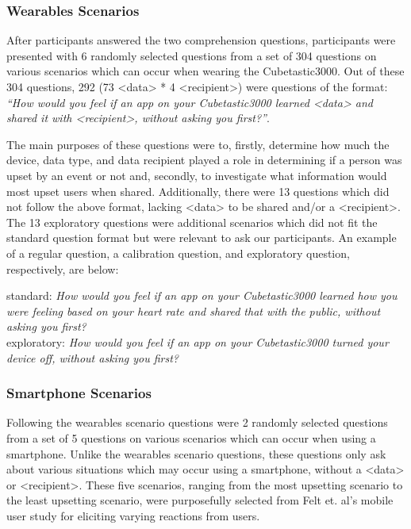 \documentclass{acm_proc_article-sp}
\begin{document}
\subsubsection{Wearables Scenarios}

After participants answered the two comprehension questions, participants were presented with 6 randomly selected questions from a set of 304 questions on various scenarios which can occur when wearing the Cubetastic3000. Out of these 304 questions, 292 (73 <data> * 4 <recipient>) were questions of the format: \textit{``How would you feel if an app on your Cubetastic3000 learned <data> and shared it with <recipient>, without asking you first?''}. 

The main purposes of these questions were to, firstly, determine how much the device, data type, and data recipient played a role in determining if a person was upset by an event or not and, secondly, to investigate what information would most upset users when shared. Additionally, there were 13 questions which did not follow the above format, lacking <data> to be shared and/or a <recipient>.  The 13 exploratory questions were additional scenarios which did not fit the standard question format but were relevant to ask our participants. An example of a regular question, a calibration question, and exploratory question, respectively, are below:  

standard: \textit{How would you feel if an app on your Cubetastic3000 learned how you were feeling based on your heart rate and shared that with the public, without asking you first?}\\[-.5cm]

exploratory: \textit{How would you feel if an app on your Cubetastic3000 turned your device off, without asking you first?}\\[-.5cm]

\subsubsection{Smartphone Scenarios}
Following the wearables scenario questions were 2 randomly selected questions from a set of 5 questions on various scenarios which can occur when using a smartphone. Unlike the wearables scenario questions, these questions only ask about various situations which may occur using a smartphone, without a <data> or <recipient>. These five scenarios, ranging from the most upsetting scenario to the least upsetting scenario, were purposefully selected from Felt et. al's mobile user study \cite{Felt} for eliciting varying reactions from users. 
\end{document}
